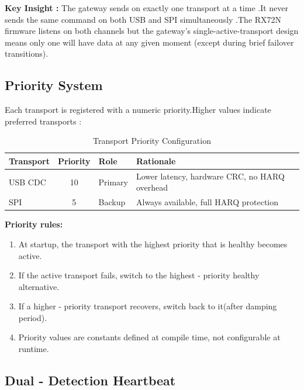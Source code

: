 \noindent\colorbox{keyinsightcolor} {
  \parbox{\dimexpr\linewidth - 2\fboxsep} {
\textbf{Key Insight :} The gateway sends on exactly one transport at a time
            .It never sends the same command on both USB and SPI simultaneously
            .The RX72N firmware listens on both channels but the gateway's single-active-transport design means only one will have data at any given moment (except during brief failover transitions).
 }
}

\subsection{Priority System}

Each transport is registered with a numeric priority.Higher values indicate
    preferred transports :

\begin{table}[H]
\centering
\caption {
  Transport Priority Configuration
}
\label {
tab:
  failover - priorities
}
\begin{tabular} { l c l l}
\toprule
\textbf{Transport} & \textbf{Priority} & \textbf{Role} & \textbf{Rationale
}
\\
\midrule USB CDC & 10 & Primary &Lower latency, hardware CRC,
    no HARQ overhead \\
SPI & 5 & Backup &Always available, full HARQ protection \\
\bottomrule
\end{tabular}
\end{table}

\textbf{Priority rules:}
\begin{enumerate}[leftmargin = 1.5em, topsep = 4pt, itemsep = 2pt]
    \item At startup,
    the transport with the highest priority that is healthy becomes active.
    \item If the active transport fails,
    switch to the highest - priority healthy alternative.
    \item If a higher - priority transport recovers,
    switch back to it(after damping period).
    \item Priority values are constants defined at compile time,
    not configurable at runtime.
\end{enumerate}

\subsection{Dual - Detection Heartbeat}

